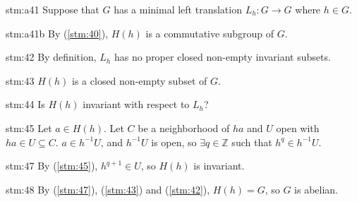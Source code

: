 \begin{statement}{stm:a41}
Suppose that $G$ has a minimal left translation $L_h : G \to G$ where $h \in G$.
\end{statement}

\begin{statement}{stm:a41b}
By (\ref{stm:40}), $H(h)$ is a commutative subgroup of $G$.
\end{statement}

\begin{statement}{stm:42}
By definition, $L_h$ has no proper closed non-empty invariant subsets.
\end{statement}

\begin{statement}{stm:43}
$H(h)$ is a closed non-empty subset of $G$.
\end{statement}

\begin{explanation}{stm:44}
Is $H(h)$ invariant with respect to $L_h$?
\end{explanation}

\begin{statement}{stm:45}
Let $a \in H(h)$. Let $C$ be a neighborhood of $ha$ and $U$ open with $ha \in U \subseteq C$. $a \in h^{-1}U$, and $h^{-1}U$ is open, so $\exists q \in \mathbb{Z}$ such that $h^q \in h^{-1}U$.
\end{statement}

\begin{statement}{stm:47}
By (\ref{stm:45}), $h^{q+1} \in U$, so $H(h)$ is invariant.
\end{statement}

\begin{statement}{stm:48}
By (\ref{stm:47}), (\ref{stm:43}) and (\ref{stm:42}), $H(h) = G$, so $G$ is abelian.
\end{statement}